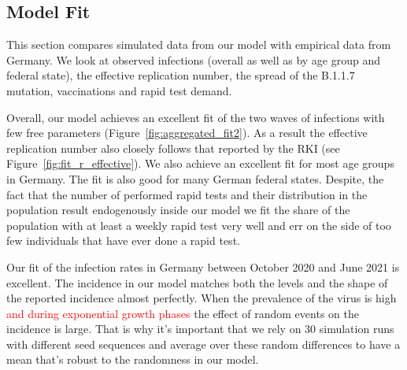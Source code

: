 \subsection{Model Fit}
\label{subsec:fit_results}

This section compares simulated data from our model with empirical data from Germany. We
look at observed infections (overall as well as by age group and federal state), the
effective replication number,  the spread of the B.1.1.7 mutation,
vaccinations and rapid test demand.

Overall, our model achieves an excellent fit of the two waves of infections with few free
parameters (Figure~\ref{fig:aggregated_fit2}). As a result the effective replication
number also closely follows that reported by the RKI (see
Figure~\ref{fig:fit_r_effective}). We also achieve an excellent fit for most age groups
in Germany. The fit is also good for many German federal states. Despite, the fact that
the number of performed rapid tests and their distribution in the population result
endogenously inside our model we fit the share of the population with at least a weekly
rapid test very well and err on the side of too few individuals that have ever done a
rapid test.

Our fit of the infection rates in Germany between October 2020 and June 2021 is
excellent. The incidence in our model matches both the levels and the shape of the
reported incidence almost perfectly. When the prevalence of the virus is high
\textcolor{red}{and during exponential growth phases} the effect of random events on the
incidence is large. That is why it's important that we rely on 30 simulation runs with
different seed sequences and average over these random differences to have a mean that's
robust to the randomness in our model.

